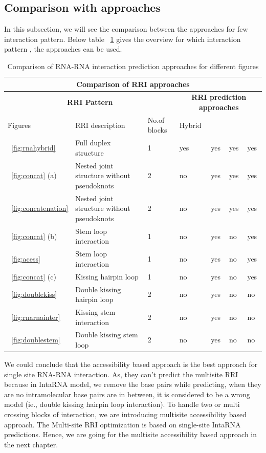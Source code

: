 \documentclass[twoside,a4paper]{report}
\begin{document}
	\subsection{Comparison with approaches}
	In this subsection, we will see the comparison between the approaches for few interaction pattern. Below table ~\ref{table:1} gives the overview for which interaction pattern , the approaches can be used. \\
		\begin{table}[H]
				\caption{ Comparison of RNA-RNA interaction prediction approaches for different figures}
				\label{table:1}
		\begin{tabularx}{\textwidth}{ p{2cm}p{4.5cm}p{1.5cm}p{1cm}p{1cm}p{1cm}p{1cm}}
		\toprule
		\multicolumn{7}{c}{\textbf{Comparison of RRI approaches}}\\  
		\midrule
		\multicolumn{3}{c}{\textbf{RRI Pattern}}  & \multicolumn{4}{c}{\textbf{RRI prediction approaches}} \\
		\cmidrule(r){1-3}  \cmidrule(r){4-7}
		Figures & RRI description& No.of blocks& \rotatebox[origin=c]{90} {Hybrid}  &\rotatebox[origin=c]{90}{General}  &\rotatebox[origin=c]{90}{Concatenation}  &\rotatebox[origin=c]{90}{Accessibility} \\
		\hline
		\hline
		~\ref{fig:rnahybrid}&Full duplex structure&1 &yes &yes &yes &yes\\
		\hline
		~\ref{fig:concat} (a)& Nested joint structure without pseudoknots &2 & no &yes &yes &yes \\
		\hline
		~\ref{fig:concatenation}& Nested joint structure without pseudoknots &2 & no &yes &yes &yes \\
		\hline
		~\ref{fig:concat} (b)& Stem loop interaction &1 & no &yes &no &yes \\
		\hline
		~\ref{fig:acess} & Stem loop interaction &1 & no &yes &no &yes \\
		\hline
		~\ref{fig:concat} (c)& Kissing hairpin loop &1 & no &yes &no &yes \\
		\hline
		~\ref{fig:doublekiss}&Double kissing hairpin loop &2 &no &yes &no &no\\
		\hline
		~\ref{fig:rnarnainter}& Kissing stem interaction &2 &no &yes &no &no\\
		\hline
		~\ref{fig:doublestem}& Double kissing stem loop &2 &no &yes &no &no\\
		\hline
		
	\end{tabularx}
	\end{table}
	We could conclude that the accessibility based approach is the best approach for single site RNA-RNA interaction. As, they can't predict the multisite RRI because in IntaRNA model, we remove the base pairs while predicting, when they are no intramolecular base pairs are in between, it is considered to be a wrong model (ie., double kissing hairpin loop interaction).  To handle two or multi crossing blocks of interaction, we are introducing multisite accessibility based approach. The Multi-site RRI optimization is based on single-site IntaRNA predictions. Hence, we are going for the multisite accessibility based approach in the next chapter.\\
\end{document}
